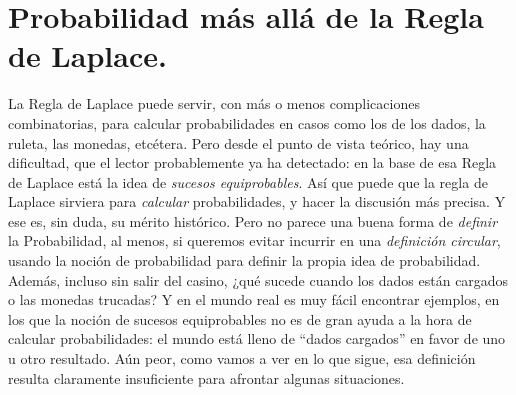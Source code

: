 \section{Probabilidad más allá de la Regla de Laplace.}
\label{cap03:sec:ProbabilidadMasAllaReglaLaplace}

La Regla de Laplace puede servir, con más o menos complicaciones combinatorias, para calcular probabilidades en casos como los de los dados, la
ruleta, las monedas, etcétera. Pero desde el punto de vista teórico, hay una dificultad, que el lector probablemente ya ha detectado: en la base de
esa Regla de Laplace está la idea de {\em sucesos equiprobables}. Así que puede que la regla de Laplace sirviera para {\em calcular} probabilidades, y
hacer la discusión más precisa. Y ese es, sin duda, su mérito histórico. Pero no parece una buena forma de {\em definir} la Probabilidad, al menos, si queremos evitar incurrir en una {\em definición circular}, usando la noción de probabilidad para definir la propia idea de probabilidad. Además, incluso sin salir del casino, ¿qué sucede cuando los dados están cargados o las monedas trucadas? Y en el mundo real es muy fácil encontrar ejemplos, en los que la noción de sucesos equiprobables no es de gran ayuda a la hora de calcular probabilidades: el mundo está lleno de ``dados cargados'' en favor de uno u otro resultado. Aún peor, como vamos a ver en lo que sigue, esa definición resulta claramente insuficiente para afrontar algunas situaciones.

